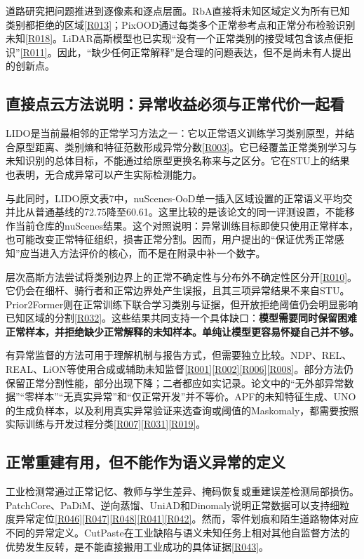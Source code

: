 \documentclass[11pt,a4paper]{article}
\newcommand{\paper}[1]{\allowbreak\hyperlink{#1}{[#1]}\allowbreak}
\begin{document}
道路研究把问题推进到逐像素和逐点层面。RbA直接将未知区域定义为所有已知类别都拒绝的区域\paper{R013}；PixOOD通过每类多个正常参考点和正常分布检验识别未知\paper{R018}。LiDAR高斯模型也已实现“没有一个正常类别的接受域包含该点便拒识”\paper{R011}。因此，“缺少任何正常解释”是合理的问题表达，但不是尚未有人提出的创新点。

\subsection{直接点云方法说明：异常收益必须与正常代价一起看}

LIDO是当前最相邻的正常学习方法之一：它以正常语义训练学习类别原型，并结合原型距离、类别熵和特征范数形成异常分数\paper{R003}。它已经覆盖正常类别学习与未知识别的总体目标，不能通过给原型更换名称来与之区分。它在STU上的结果也表明，无合成异常可以产生实际检测能力。

与此同时，LIDO原文表7中，nuScenes-OoD单一插入区域设置的正常语义平均交并比从普通基线的72.75降至60.61。这里比较的是该论文的同一评测设置，不能移作当前仓库的nuScenes结果。这个对照说明：异常训练目标即使只使用正常样本，也可能改变正常特征组织，损害正常分割。因而，用户提出的“保证优秀正常感知”应当进入方法评价的核心，而不是在附录中补一个数字。

层次高斯方法尝试将类别边界上的正常不确定性与分布外不确定性区分开\paper{R010}。它仍会在细杆、骑行者和正常边界处产生误报，且其三项异常结果不来自STU。Prior2Former则在正常训练下联合学习类别与证据，但开放拒绝阈值仍会明显影响已知区域的分割\paper{R032}。这些结果共同支持一个具体缺口：\textbf{模型需要同时保留困难正常样本，并拒绝缺少正常解释的未知样本。单纯让模型更容易怀疑自己并不够。}

有异常监督的方法可用于理解机制与报告方式，但需要独立比较。NDP、REL、REAL、LiON等使用合成或辅助未知监督\paper{R001}\paper{R002}\paper{R006}\paper{R008}。部分方法仍保留正常分割性能，部分出现下降；二者都应如实记录。论文中的“无外部异常数据”“零样本”“无真实异常”和“仅正常开发”并不等价。APF的未知特征生成、UNO的生成负样本，以及利用真实异常验证来选查询或阈值的Maskomaly，都需要按照实际训练与开发过程分类\paper{R007}\paper{R031}\paper{R019}。

\subsection{正常重建有用，但不能作为语义异常的定义}

工业检测常通过正常记忆、教师与学生差异、掩码恢复或重建误差检测局部损伤。PatchCore、PaDiM、逆向蒸馏、UniAD和Dinomaly说明正常数据可以支持细粒度异常定位\paper{R046}\paper{R047}\paper{R048}\paper{R041}\paper{R042}。然而，零件划痕和陌生道路物体对应不同的异常定义。CutPaste在工业缺陷与语义未知任务上相对其他自监督方法的优势发生反转，是不能直接搬用工业成功的具体证据\paper{R043}。
\end{document}
